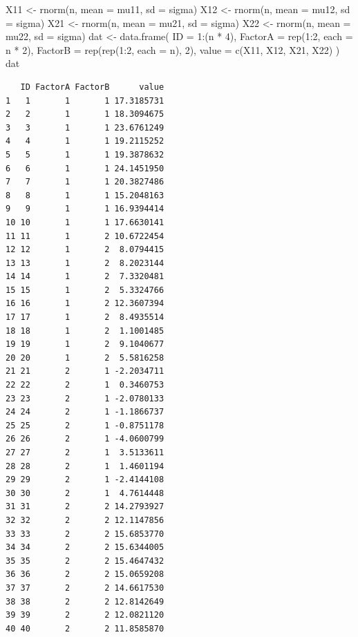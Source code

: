 \documentclass[
  a4paper,
]{ltjsbook}
\newenvironment{Shaded}{\begin{snugshade}}{\end{snugshade}}
\newcommand{\AttributeTok}[1]{\textcolor[rgb]{0.40,0.45,0.13}{#1}}
\newcommand{\DecValTok}[1]{\textcolor[rgb]{0.68,0.00,0.00}{#1}}
\newcommand{\FunctionTok}[1]{\textcolor[rgb]{0.28,0.35,0.67}{#1}}
\newcommand{\NormalTok}[1]{\textcolor[rgb]{0.00,0.23,0.31}{#1}}
\newcommand{\OtherTok}[1]{\textcolor[rgb]{0.00,0.23,0.31}{#1}}
\newcommand{\SpecialCharTok}[1]{\textcolor[rgb]{0.37,0.37,0.37}{#1}}
\begin{document}
\begin{Shaded}
\begin{Highlighting}[]
\NormalTok{X11 }\OtherTok{\textless{}{-}} \FunctionTok{rnorm}\NormalTok{(n, }\AttributeTok{mean =}\NormalTok{ mu11, }\AttributeTok{sd =}\NormalTok{ sigma)}
\NormalTok{X12 }\OtherTok{\textless{}{-}} \FunctionTok{rnorm}\NormalTok{(n, }\AttributeTok{mean =}\NormalTok{ mu12, }\AttributeTok{sd =}\NormalTok{ sigma)}
\NormalTok{X21 }\OtherTok{\textless{}{-}} \FunctionTok{rnorm}\NormalTok{(n, }\AttributeTok{mean =}\NormalTok{ mu21, }\AttributeTok{sd =}\NormalTok{ sigma)}
\NormalTok{X22 }\OtherTok{\textless{}{-}} \FunctionTok{rnorm}\NormalTok{(n, }\AttributeTok{mean =}\NormalTok{ mu22, }\AttributeTok{sd =}\NormalTok{ sigma)}
\NormalTok{dat }\OtherTok{\textless{}{-}} \FunctionTok{data.frame}\NormalTok{(}
  \AttributeTok{ID =} \DecValTok{1}\SpecialCharTok{:}\NormalTok{(n }\SpecialCharTok{*} \DecValTok{4}\NormalTok{),}
  \AttributeTok{FactorA =} \FunctionTok{rep}\NormalTok{(}\DecValTok{1}\SpecialCharTok{:}\DecValTok{2}\NormalTok{, }\AttributeTok{each =}\NormalTok{ n }\SpecialCharTok{*} \DecValTok{2}\NormalTok{),}
  \AttributeTok{FactorB =} \FunctionTok{rep}\NormalTok{(}\FunctionTok{rep}\NormalTok{(}\DecValTok{1}\SpecialCharTok{:}\DecValTok{2}\NormalTok{, }\AttributeTok{each =}\NormalTok{ n), }\DecValTok{2}\NormalTok{),}
  \AttributeTok{value =} \FunctionTok{c}\NormalTok{(X11, X12, X21, X22)}
\NormalTok{)}
\NormalTok{dat}
\end{Highlighting}
\end{Shaded}

\begin{verbatim}
   ID FactorA FactorB      value
1   1       1       1 17.3185731
2   2       1       1 18.3094675
3   3       1       1 23.6761249
4   4       1       1 19.2115252
5   5       1       1 19.3878632
6   6       1       1 24.1451950
7   7       1       1 20.3827486
8   8       1       1 15.2048163
9   9       1       1 16.9394414
10 10       1       1 17.6630141
11 11       1       2 10.6722454
12 12       1       2  8.0794415
13 13       1       2  8.2023144
14 14       1       2  7.3320481
15 15       1       2  5.3324766
16 16       1       2 12.3607394
17 17       1       2  8.4935514
18 18       1       2  1.1001485
19 19       1       2  9.1040677
20 20       1       2  5.5816258
21 21       2       1 -2.2034711
22 22       2       1  0.3460753
23 23       2       1 -2.0780133
24 24       2       1 -1.1866737
25 25       2       1 -0.8751178
26 26       2       1 -4.0600799
27 27       2       1  3.5133611
28 28       2       1  1.4601194
29 29       2       1 -2.4144108
30 30       2       1  4.7614448
31 31       2       2 14.2793927
32 32       2       2 12.1147856
33 33       2       2 15.6853770
34 34       2       2 15.6344005
35 35       2       2 15.4647432
36 36       2       2 15.0659208
37 37       2       2 14.6617530
38 38       2       2 12.8142649
39 39       2       2 12.0821120
40 40       2       2 11.8585870
\end{verbatim}
\end{document}
